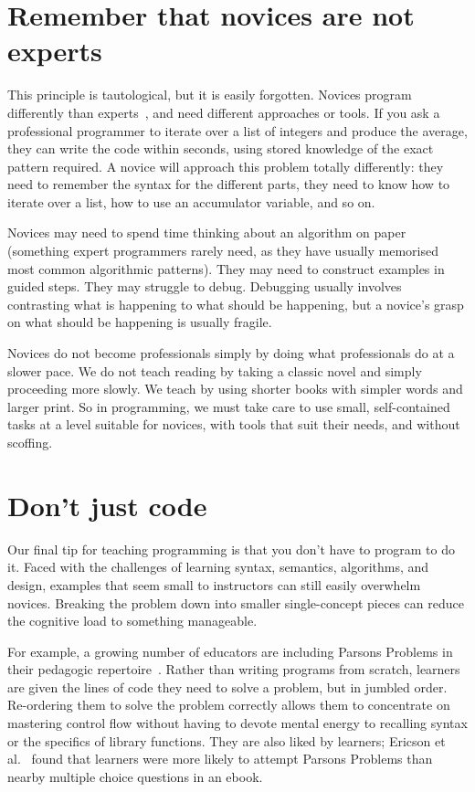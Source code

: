 \documentclass[10pt,letterpaper]{article}
\newcommand{\rulemajor}[2]{\section{#1}\label{#2}}
\newcommand{\evidence}[1]{}
\begin{document}
\rulemajor{Remember that novices are not experts}{not-experts}
\evidence{Medium}

This principle is tautological, but it is easily forgotten.
Novices program differently than experts~\cite{parnin-expertise},
and need different approaches or tools.
If you ask a professional programmer to iterate over a list of integers and produce the average,
they can write the code within seconds,
using stored knowledge of the exact pattern required.
A novice will approach this problem totally differently:
they need to remember the syntax for the different parts,
they need to know how to iterate over a list,
how to use an accumulator variable,
and so on.

Novices may need to spend time thinking about an algorithm on paper
(something expert programmers rarely need,
as they have usually memorised most common algorithmic patterns).
They may need to construct examples in guided steps.
They may struggle to debug.
Debugging usually involves contrasting what is happening to what should be happening,
but a novice's grasp on what should be happening is usually fragile.

Novices do not become professionals simply by doing what professionals do at a slower pace.
We do not teach reading by taking a classic novel and simply proceeding more slowly.
We teach by using shorter books with simpler words and larger print.
So in programming,
we must take care to use small, self-contained tasks at a level suitable for novices,
with tools that suit their needs, and without scoffing.

\rulemajor{Don't just code}{not-just-code}
\evidence{Medium}

Our final tip for teaching programming is that you don't have to program to do it.
Faced with the challenges of learning syntax, semantics, algorithms, and design,
examples that seem small to instructors can still easily overwhelm novices.
Breaking the problem down into smaller single-concept pieces
can reduce the cognitive load to something manageable.

For example,
a growing number of educators are including Parsons Problems
in their pedagogic repertoire~\cite{parsons,morrison-parsons}.
Rather than writing programs from scratch,
learners are given the lines of code they need to solve a problem,
but in jumbled order.
Re-ordering them to solve the problem correctly
allows them to concentrate on mastering control flow
without having to devote mental energy to recalling syntax
or the specifics of library functions.  They are also liked by learners; Ericson et al.~\cite{ericson-ebook} found
that learners were more likely to attempt Parsons Problems than nearby multiple choice questions in an ebook.
\end{document}
